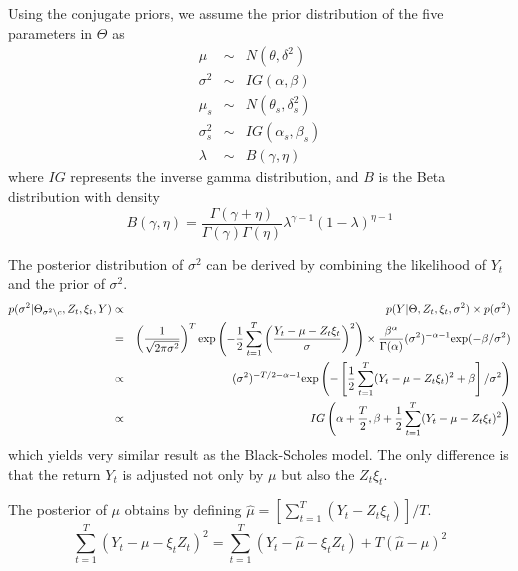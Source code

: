 \documentclass[11pt,reqno,final]{amsart}
\def\exp{\hbox{\rm exp}}
\begin{document}
Using the conjugate priors, we assume the prior distribution of the five parameters in $\Theta$ as
\begin{eqnarray*}
\mu         &\sim& N(\theta, \delta^2) \\
\sigma^2    &\sim& IG(\alpha, \beta) \\
\mu_s       &\sim& N(\theta_s, \delta_s^2) \\
\sigma_s^2  &\sim& IG(\alpha_s, \beta_s) \\
\lambda     &\sim& B(\gamma, \eta)
\end{eqnarray*}
where $IG$ represents the inverse gamma distribution, and $B$ is the Beta distribution with density
$$
B(\gamma, \eta) = \frac{\Gamma(\gamma+\eta)}{\Gamma(\gamma)\Gamma(\eta)}\lambda^{\gamma-1}(1-\lambda)^{\eta-1}
$$

The posterior distribution of $\sigma^2$ can be derived by combining the likelihood of $Y_t$ and the prior of $\sigma^2$.
\begin{eqnarray*}
p(\sigma^2|\Theta_{\sigma^2 \backslash c}, Z_t, \xi_t, Y)  &\propto& p(Y|\Theta, Z_t, \xi_t,\sigma^2) \times p(\sigma^2) \\
                    &=& \left( \frac{1}{\sqrt{2\pi\sigma^2}} \right)^T \exp\left( -\frac{1}{2} \sum_{t=1}^{T} \left( \frac{Y_t - \mu - Z_t \xi_t}{\sigma}\right)^2 \right) \times \frac{\beta^{\alpha}}{\Gamma(\alpha)} (\sigma^2)^{-\alpha-1} \exp(-\beta/\sigma^2) \\
                    &\propto& (\sigma^2)^{-T/2-\alpha-1} \exp\left( -\left[\frac{1}{2}\sum_{t=1}^{T} (Y_t-\mu-Z_t \xi_t)^2 + \beta \right]/\sigma^2 \right) \\
                    &\propto& IG\left(\alpha+\frac{T}{2}, \beta+\frac{1}{2}\sum_{t=1}^{T}(Y_t-\mu -Z_t \xi_t)^2 \right)
\end{eqnarray*}
which yields very similar result as the Black-Scholes model. The only difference is that the return $Y_t$ is adjusted not only by $\mu$ but also the $Z_t \xi_t$.

The posterior of $\mu$ obtains by defining $\hat{\mu}=\left[ \sum_{t=1}^T (Y_t-Z_t \xi_t) \right]/T$.
$$
\sum_{t=1}^T (Y_t - \mu - \xi_t Z_t)^2 = \sum_{t=1}^T (Y_t - \hat{\mu} - \xi_t Z_t) + T (\hat{\mu} - \mu)^2
$$
\end{document}
